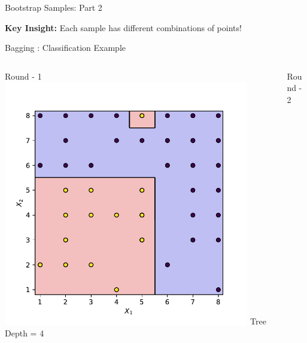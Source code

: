 \documentclass[8pt]{beamer}
\newcommand{\fitpic}[1]{\begin{adjustbox}{max width=\linewidth, max totalheight=0.78\textheight}#1\end{adjustbox}}
\begin{document}
\begin{frame}{Bootstrap Samples: Part 2}
\begin{keypointsbox}
\textbf{Key Insight:} Each sample has different combinations of points!
\end{keypointsbox}
\end{frame}


\begin{frame}{Bagging : Classification Example}
  \vspace{0.3cm}
  \begin{columns}
    \pause  \begin{column}{0.3\textwidth}
      \centering
      Round - 1\\

      \fitpic{\includegraphics[width = 0.9\textwidth]{../assets/ensemble/figures/decision-boundary-0}}
      Tree Depth = 4

    \end{column}
    \pause  \begin{column}{0.3\textwidth}
      \centering
      Round - 2\\


\end{column}
\end{columns}
\end{frame}
\end{document}
